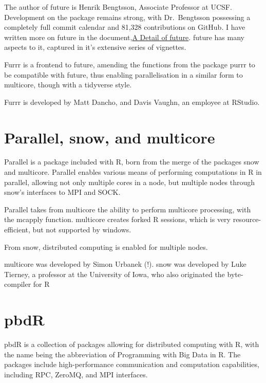 \documentclass[10pt,a4paper]{article}
\begin{document}
The author of future is Henrik Bengtsson, Associate Professor at UCSF.
Development on the package remains strong, with Dr.~Bengtsson
possessing a completely full commit calendar and 81,328 contributions
on GitHub. I have written more on future in the
document,\href{review-future.pdf}{A Detail of future}. future has many
aspects to it, captured in it's extensive series of
vignettes\cite{bengtsson20:_futur_r}\cite{bengtsson20:_futur_r2}\cite{bengtsson20:_futur_r3}\cite{bengtsson20:_futur_r4}\cite{bengtsson20:_futur_r5}\cite{bengtsson20:_futur_r6}.

Furrr is a frontend to future, amending the functions from the package
purrr to be compatible with future, thus enabling parallelisation in a
similar form to multicore, though with a tidyverse
style\cite{vaughan18}.

Furrr is developed by Matt Dancho, and Davis Vaughn, an employee at
RStudio.

\section{Parallel, snow, and multicore}
\label{sec:parall-snow-mult}
Parallel is a package included with R, born from the merge of the
packages snow and multicore\cite{core:_packag}. Parallel enables
various means of performing computations in R in parallel, allowing
not only multiple cores in a node, but multiple nodes through snow's
interfaces to MPI and SOCK\cite{tierney18}.

Parallel takes from multicore the ability to perform multicore
processing, with the mcapply function. multicore creates forked R
sessions, which is very resource-efficient, but not supported by
windows.

From snow, distributed computing is enabled for multiple nodes.

multicore was developed by Simon Urbanek (!). snow was developed by
Luke Tierney, a professor at the University of Iowa, who also
originated the byte-compiler for R

\section{pbdR}
\label{sec:pbdr}

pbdR is a collection of packages allowing for distributed computing
with R\cite{pbdBASEpackage}, with the name being the abbreviation of
Programming with Big Data in R. The packages include high-performance
communication and computation capabilities, including RPC, ZeroMQ, and
MPI interfaces.
\end{document}
